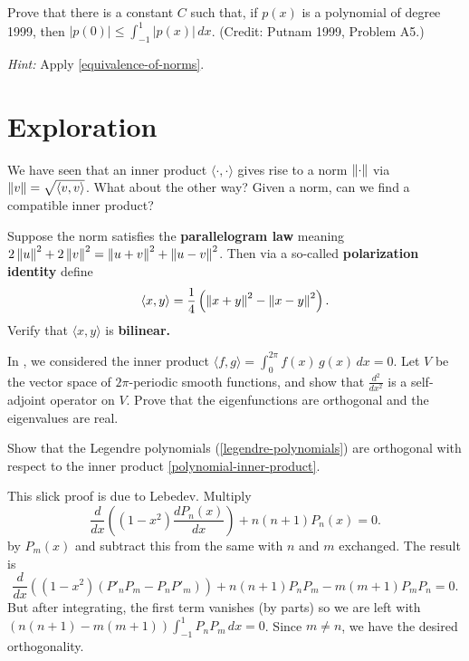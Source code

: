 \documentclass{homework}
\begin{document}
\begin{problem}
  Prove that there is a constant $C$  such that,  if  $p(x)$  is a polynomial of degree 1999,  then  $|p(0)| \leq \displaystyle\int_{-1}^1 \left|p(x)\right| \, dx$. (Credit: Putnam 1999, Problem A5.)
  
  \textit{Hint:} Apply \ref{equivalence-of-norms}.
\end{problem}

\section{Exploration}

\begin{problem}
  We have seen that an inner product $\langle \cdot,\cdot\rangle$
  gives rise to a norm $\left\lVert\cdot\right\rVert$ via
  $\left\lVert v\right\rVert = \sqrt{\langle v, v \rangle}$.  What about the other way?
  Given a norm, can we find a compatible inner product?

  Suppose the norm satisfies the \textbf{parallelogram law} meaning
  $2 \left\lVert u\right\rVert^2 + 2 \left\lVert v\right\rVert^2 = \left\lVert u+v\right\rVert^2 + \left\lVert u-v\right\rVert^2$.
  Then via a so-called \textbf{polarization identity} define \[
    \langle x, y\rangle = \frac{1}{4} \left( \left\lVert x+y\right\rVert^2 - \left\lVert x-y\right\rVert^2 \right).
  \]
  Verify that $\langle x, y\rangle$ is \textbf{bilinear.}
\end{problem}

\begin{problem}
  In \label{wave-equation-orthogonal}, we considered the inner product
  \( \langle f,g \rangle =
    \displaystyle\int_0^{2\pi} f(x) \, g(x) \, dx = 0. \)
  Let $V$ be the vector space of $2\pi$-periodic smooth functions, and show that $\frac{d^2}{dx^2}$ is a self-adjoint operator on $V$.  Prove that the eigenfunctions are orthogonal and the eigenvalues are real.
\end{problem}

\begin{problem}
  Show that the Legendre polynomials (\ref{legendre-polynomials}) are orthogonal with respect to the inner product \eqref{polynomial-inner-product}.
\end{problem}

\begin{solution}
  This slick proof is due to Lebedev.  Multiply
    \[
      \frac{d}{dx}\left(\left(1-x^{2}\right){\frac {d P_{n}(x)}{dx}}\right)+n(n+1)P_{n}(x)=0.
    \]
    by $P_{m}(x)$ and subtract this from the same with $n$ and $m$ exchanged.  The result is
    \[
      \frac{d}{dx}\left(\left(1-x^{2}\right) \left( P'_n P_m - P_n P'_m \right) \right)+n(n+1)P_{n} P_{m} - m(m+1)P_{m} P_{n} =0.
    \]
    But after integrating, the first term vanishes (by parts) so we are left with $\left( n(n+1) - m(m+1) \right) \int_{-1}^1 P_n P_m \, dx = 0$.  Since $m \neq n$, we have the desired orthogonality.
\end{solution}
\end{document}

